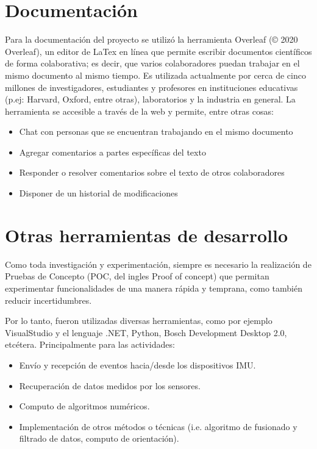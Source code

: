 \section{Documentación} 

Para la documentación del proyecto se utilizó la herramienta Overleaf (© 2020 Overleaf), un editor de LaTex en línea que permite escribir documentos científicos de forma colaborativa; es decir, que varios colaboradores puedan trabajar en el mismo documento al mismo tiempo. Es utilizada actualmente por cerca de cinco millones de investigadores, estudiantes y profesores en instituciones educativas (p.ej: Harvard, Oxford, entre otras), laboratorios y la industria en general. La herramienta se accesible a través de la web y permite, entre otras cosas:

\begin{itemize}
    \item Chat con personas que se encuentran trabajando en el mismo documento 
    \item Agregar comentarios a partes específicas del texto 
    \item Responder o resolver comentarios sobre el texto de otros colaboradores 
    \item Disponer de un historial de modificaciones 
\end{itemize} 

\section{Otras herramientas de desarrollo}

Como toda investigación y experimentación, siempre es necesario la realización de Pruebas de Concepto (POC, del ingles Proof of concept) que permitan experimentar funcionalidades de una manera rápida y temprana, como también reducir incertidumbres.

Por lo tanto, fueron utilizadas diversas herramientas, como por ejemplo VisualStudio y el lenguaje .NET, Python, Bosch Development Desktop 2.0, etcétera. Principalmente para las actividades:

\begin{itemize}
    \item Envío y recepción de eventos hacia/desde los dispositivos IMU.
    \item Recuperación de datos medidos por los sensores.
    \item Computo de algoritmos numéricos.
    \item Implementación de otros métodos o técnicas (i.e. algoritmo de fusionado y filtrado de datos, computo de orientación).
\end{itemize}